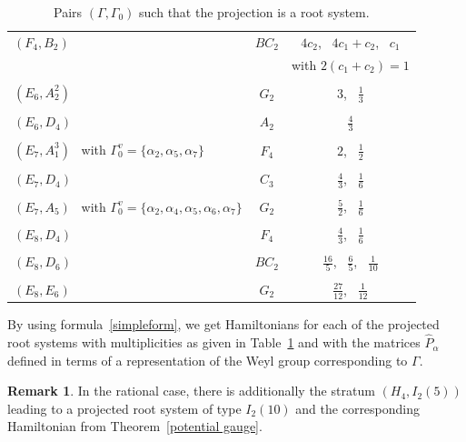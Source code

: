 \documentclass[12pt]{amsart}
\numberwithin{equation}{section}
\theoremstyle{definition}
\newtheorem{remark}[theorem]{Remark}
\begin{document}
\begin{center}
\begin{table}
\begin{longtable}[c]{|l | c | c|}
         $(F_4, B_2)$ & $BC_2$ & $4c_2$, \ $4c_1 + c_2$, \ $c_1$ \\
          & & with $2(c_1 + c_2)=1$ \\ & & \\
         $(E_6,A_2^2)$ & $G_2$ & $3$, \ $\frac13$ \\ & & \\
         $(E_6,D_4)$ & $A_2$ & $\frac43$ \\ & & \\
         $(E_7, A_1^3)$ \ with $\Gamma_0^v = \{ \alpha_2, \alpha_5, \alpha_7 \}$ & $F_4$ & $2$, \ $\frac12$  \\ & & \\ 
         $(E_7, D_4)$ & $C_3$ & $\frac43$, \ $\frac16$ \\ & & \\
         $(E_7, A_5)$ \ with $\Gamma_0^v = \{\alpha_2, \alpha_4, \alpha_5, \alpha_6, \alpha_7\}$ & $G_2$ & $\frac52$, \ $\frac16$ \\ & & \\
         $(E_8, D_4)$ & $F_4$ & $\frac43$, \ $\frac16$ \\ & & \\
         $(E_8, D_6)$ & $BC_2$ & $\frac{16}{5}$, \ $\frac{6}{5}$, \ $\frac{1}{10}$ \\ & & \\
         $(E_8, E_6)$ & $G_2$ & $\frac{27}{12}$, \ $\frac{1}{12}$
         \\ [1ex] 
         \hline
    \end{longtable}
    \setcounter{table}{0}
    \caption{Pairs $(\Gamma, \Gamma_0)$ such that the projection is a root system.}
    \label{tbl}
    \end{table}
\end{center}
\newpage

By using formula~\eqref{simpleform}, we get Hamiltonians for each of the projected root systems with multiplicities as given in Table~\ref{tbl} and with the matrices $\widehat{P}_\alpha$ defined in terms of a representation of the Weyl group corresponding to $\Gamma$.

\begin{remark}
In the rational case, there is additionally the stratum $(H_4, I_2(5))$ leading to a projected root system of type $I_2(10)$ and the corresponding Hamiltonian from Theorem~\ref{potential gauge}.
\end{remark}
\end{document}
